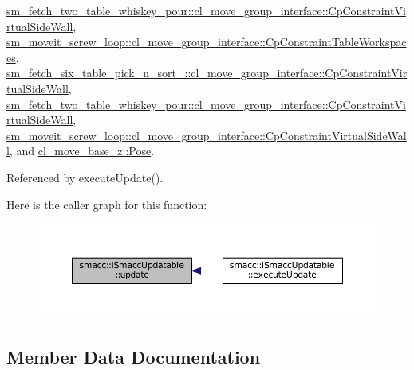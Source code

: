 \hyperlink{classsm__fetch__two__table__whiskey__pour_1_1cl__move__group__interface_1_1CpConstraintVirtualSideWall_a0d810890cc65189012a33af233d18c9f}{sm\+\_\+fetch\+\_\+two\+\_\+table\+\_\+whiskey\+\_\+pour\+::cl\+\_\+move\+\_\+group\+\_\+interface\+::\+Cp\+Constraint\+Virtual\+Side\+Wall}, \hyperlink{classsm__moveit__screw__loop_1_1cl__move__group__interface_1_1CpConstraintTableWorkspaces_a873050debbad5977c78beb93a0b6ce77}{sm\+\_\+moveit\+\_\+screw\+\_\+loop\+::cl\+\_\+move\+\_\+group\+\_\+interface\+::\+Cp\+Constraint\+Table\+Workspaces}, \hyperlink{classsm__fetch__six__table__pick__n__sort__1_1_1cl__move__group__interface_1_1CpConstraintVirtualSideWall_a7631ce0dba22a59484ad96eb0f5482d5}{sm\+\_\+fetch\+\_\+six\+\_\+table\+\_\+pick\+\_\+n\+\_\+sort\+\_\+::cl\+\_\+move\+\_\+group\+\_\+interface\+::\+Cp\+Constraint\+Virtual\+Side\+Wall}, \hyperlink{classsm__fetch__two__table__whiskey__pour_1_1cl__move__group__interface_1_1CpConstraintVirtualSideWall_a2295eef9dd270ab1e9d2b0837f103352}{sm\+\_\+fetch\+\_\+two\+\_\+table\+\_\+whiskey\+\_\+pour\+::cl\+\_\+move\+\_\+group\+\_\+interface\+::\+Cp\+Constraint\+Virtual\+Side\+Wall}, \hyperlink{classsm__moveit__screw__loop_1_1cl__move__group__interface_1_1CpConstraintVirtualSideWall_a4582ad379597080236133d0f354f694e}{sm\+\_\+moveit\+\_\+screw\+\_\+loop\+::cl\+\_\+move\+\_\+group\+\_\+interface\+::\+Cp\+Constraint\+Virtual\+Side\+Wall}, and \hyperlink{classcl__move__base__z_1_1Pose_abf99d1127cf51a93f97ada2031196114}{cl\+\_\+move\+\_\+base\+\_\+z\+::\+Pose}.



Referenced by execute\+Update().

Here is the caller graph for this function\+:
\nopagebreak
\begin{figure}[H]
\begin{center}
\leavevmode
\includegraphics[width=350pt]{classsmacc_1_1ISmaccUpdatable_a84ee0520cbefdb1d412bed54650b028e_icgraph}
\end{center}
\end{figure}


\subsection{Member Data Documentation}
\mbox{\label{classsmacc_1_1ISmaccUpdatable_ad58f7e1cd26d3fe8c3a3fccecc57feac}} 
